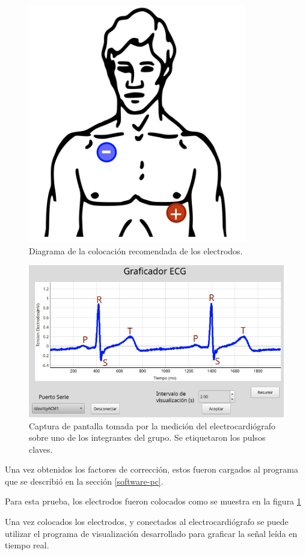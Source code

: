 \documentclass[conference]{IEEEtran}
\begin{document}
\begin{figure}[tb]
    \centering
    \includegraphics[width=0.5\linewidth]{figs/ubiacion_electrodos.png}
    \caption{Diagrama de la colocación recomendada de los electrodos.}
    \label{fig:ubicacion_electrodos}

\end{figure}
\begin{figure}[tb]
    \centering
    \includegraphics[width=\linewidth]{figs/graficador_ecg_etiquetado.png}
    \caption{Captura de pantalla tomada por la medición del electrocardiógrafo sobre 
    uno de los integrantes del grupo. Se etiquetaron los pulsos claves.}
    \label{fig:ecg_real}

\end{figure}


Una vez obtenidos los factores de corrección, estos fueron cargados al programa
que se describió en la sección \ref{software-pc}.

Para esta prueba, los electrodos fueron colocados como se muestra en la figura
\ref{fig:ubicacion_electrodos}

Una vez colocados los electrodos, y conectados al electrocardiógrafo se puede utilizar
el programa de visualización desarrollado para graficar la señal leída en tiempo
real.
\end{document}
